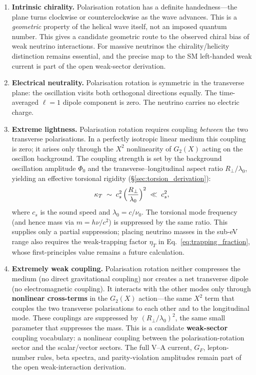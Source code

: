 \documentclass[11pt]{article}
\begin{document}
\begin{enumerate}
  \item \textbf{Intrinsic chirality.}\;
    Polarisation rotation has a definite
    handedness---the plane turns clockwise or
    counterclockwise as the wave advances.
    This is a \emph{geometric} property of the
    helical wave itself, not an imposed quantum
    number.  This gives a candidate geometric
    route to the observed chiral bias of weak
    neutrino interactions.  For massive neutrinos
    the chirality/helicity distinction remains
    essential, and the precise map to the SM
    left-handed weak current is part of the open
    weak-sector derivation.

  \item \textbf{Electrical neutrality.}\;
    Polarisation rotation is symmetric in the
    transverse plane: the oscillation visits
    both orthogonal directions equally.  The
    time-averaged $\ell = 1$ dipole component
    is zero.  The neutrino carries no electric
    charge.

  \item \textbf{Extreme lightness.}\;
    Polarisation rotation requires coupling
    \emph{between} the two transverse
    polarisations.  In a perfectly isotropic
    linear medium this coupling is zero; it
    arises only through the $X^2$ nonlinearity
    of $G_2(X)$ acting on the oscillon
    background.
    The coupling strength is set by the
    background oscillation amplitude
    $\Phi_0$ and the transverse--longitudinal
    aspect ratio $R_\perp/\lambda_0$, yielding
    an effective torsional rigidity
    (\S\ref{sec:torsion_derivation}):
    \begin{equation}\label{eq:torsion_rigidity}
      \kappa_T \;\sim\; c_s^2\,
      \Bigl(\frac{R_\perp}{\lambda_0}\Bigr)^2
      \;\ll\; c_s^2,
    \end{equation}
    where $c_s$ is the sound speed
    and $\lambda_0 = c/\nu_0$.  The torsional
    mode frequency (and hence mass via
    $m = h\nu/c^2$) is suppressed by the same
    ratio.  This supplies only a partial
    suppression; placing neutrino masses in the
    sub-eV range also requires the weak-trapping
    factor $\eta_T$ in Eq.~\eqref{eq:trapping_fraction},
    whose first-principles value remains a future
    calculation.

  \item \textbf{Extremely weak coupling.}\;
    Polarisation rotation neither compresses the
    medium (no direct gravitational coupling) nor
    creates a net transverse dipole (no
    electromagnetic coupling).  It interacts
    with the other modes only through
    \textbf{nonlinear cross-terms} in the
    $G_2(X)$ action---the same $X^2$ term that
    couples the two transverse polarisations to
    each other and to the longitudinal mode.
    These couplings are suppressed by
    $(R_\perp/\lambda_0)^2$, the same small
    parameter that suppresses the mass.
    This is a candidate \textbf{weak-sector}
    coupling vocabulary: a nonlinear coupling
    between the polarisation-rotation sector and
    the scalar/vector sectors.  The full
    V--A current, $G_F$, lepton-number rules,
    beta spectra, and parity-violation amplitudes
    remain part of the open weak-interaction
    derivation.


\end{enumerate}
\end{document}

